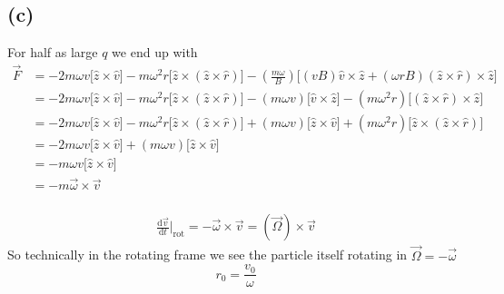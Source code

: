 \documentclass[letter, 10pts]{article}
\begin{document}
\subsection*{(c)}
For half as large $q$ we end up with 
\begin{align*}
	\vec{F} &= - 2m \omega v 
\Biggr[ 
\hat{z} \times \hat{v}
\Biggr]
- m \omega^2 r \Biggr[ \hat{z} \times (\hat{z} \times \hat{r} ) \Biggr]- 
\left(
\frac{ m \omega}{B}
\right) \Biggr[(vB)\hat{v} \times \hat{z} + (\omega rB)(\hat{z} \times  \hat{r}) \times \hat{z}\Biggr]
\\
	&= - 2m \omega v 
\Biggr[ 
\hat{z} \times \hat{v}
\Biggr]
- m \omega^2 r \Biggr[ \hat{z} \times (\hat{z} \times \hat{r} ) \Biggr]- 
\left(
	m \omega v
\right) \Biggr[\hat{v} \times \hat{z} \Biggr] - (m \omega ^2 r) \Biggr[(\hat{z} \times  \hat{r}) \times \hat{z}\Biggr]
\\
	&= - 2m \omega v 
\Biggr[ 
\hat{z} \times \hat{v}
\Biggr]
- m \omega^2 r \Biggr[ \hat{z} \times (\hat{z} \times \hat{r} ) \Biggr] + 
\left(
	m \omega v
\right) \Biggr[\hat{z} \times \hat{v} \Biggr] + (m \omega ^2 r) \Biggr[\hat{z} \times  (\hat{z} \times  \hat{r}) \Biggr]
\\
	&= - 2m \omega v 
\Biggr[ 
\hat{z} \times \hat{v}
\Biggr]
+ \left(
	m \omega v
\right) \Biggr[\hat{z} \times \hat{v} \Biggr] 
     \\ &= 
- m \omega v 
\Biggr[ \hat{z} \times \hat{v}
\Biggr] \\ 
&= 
- m \vec{\omega} \times \vec{v}
\\
\end{align*}

\begin{align*}
	\frac{\mathrm{d} \vec{v}}{\mathrm{d} t} \Biggr|_\text{rot} = -  \vec{\omega} \times  \vec{v}  = \left(\vec{\Omega}\right) \times  \vec{v} 
\end{align*}
So technically in the rotating frame we see the particle itself rotating in $\vec{\Omega} = - \vec{\omega}$
\[
\boxed{
r_0 = \frac{v_0}{\omega}
}
\] %
%
%
%
\end{document}
